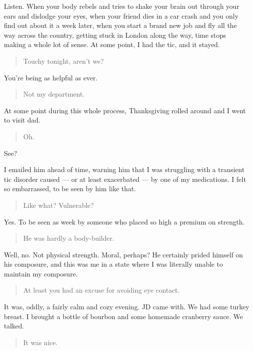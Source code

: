 Listen. When your body rebels and tries to shake your brain out through your ears and dislodge your eyes, when your friend dies in a car crash and you only find out about it a week later, when you start a brand new job and fly all the way across the country, getting stuck in London along the way, time stops making a whole lot of sense. At some point, I had the tic, and it stayed.

\begin{quote}
Touchy tonight, aren't we?
\end{quote}

You're being as helpful as ever.

\begin{quote}
Not my department.
\end{quote}

At some point during this whole process, Thanksgiving rolled around and I went to visit dad.

\begin{quote}
Oh.
\end{quote}

See?

I emailed him ahead of time, warning him that I was struggling with a transient tic disorder caused --- or at least exacerbated --- by one of my medications. I felt so embarrassed, to be seen by him like that.

\begin{quote}
Like what? Vulnerable?
\end{quote}

Yes. To be seen as week by someone who placed so high a premium on strength.

\begin{quote}
He was hardly a body-builder.
\end{quote}

Well, no. Not physical strength. Moral, perhaps? He certainly prided himself on his composure, and this was me in a state where I was literally unable to maintain my composure.

\begin{quote}
At least you had an excuse for avoiding eye contact.
\end{quote}

It was, oddly, a fairly calm and cozy evening. JD came with. We had some turkey breast. I brought a bottle of bourbon and some homemade cranberry sauce. We talked.

\begin{quote}
It was nice.
\end{quote}

